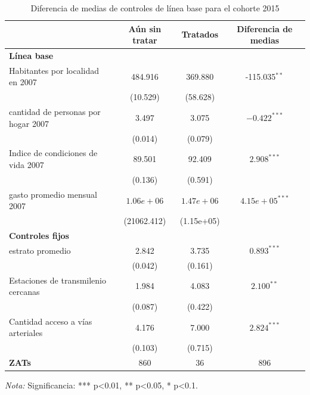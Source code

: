\documentclass{article}
\begin{document}
\begin{table} [H]
  \centering
  \caption{Diferencia de medias de controles de línea base para el cohorte 2015}
  \label{tab:comparacion_2015}
  \begin{tabular}{l c c c}
    \toprule
    & \textbf{Aún sin tratar} & \textbf{Tratados} & \textbf{Diferencia de medias} \\
    \midrule
    \multicolumn{4}{l}{\textbf{Línea base}} \\
    \midrule
    Habitantes por localidad en 2007 & 484.916 & 369.880 & -115.035$^{**}$ \\
    & (10.529) & (58.628) & \\
    cantidad de personas por hogar 2007 & 3.497 & 3.075 & $-0.422^{***}$ \\
    & (0.014) & (0.079) & \\
    Indice de condiciones de vida 2007 & 89.501 & 92.409 & $2.908^{***}$ \\
    & (0.136) & (0.591) & \\
    gasto promedio mensual 2007 & $1.06e+06$ & $1.47e+06$ & $4.15e+05^{***}$ \\
    & (21062.412) & (1.15e+05) & \\
    \midrule
    \multicolumn{4}{l}{\textbf{Controles fijos}} \\
    \midrule
    estrato promedio & 2.842 & 3.735 & $0.893^{***}$ \\
    & (0.042) & (0.161) & \\
    Estaciones de transmilenio cercanas & 1.984 & 4.083 & $2.100^{**}$ \\
    & (0.087) & (0.422) & \\
    Cantidad acceso a vías arteriales & 4.176 & 7.000 & $2.824^{***}$ \\
    & (0.103) & (0.715) & \\
    \midrule
    \textbf{ZATs} & 860 & 36 & 896 \\
    \bottomrule
  \end{tabular}
  \parbox[t]{\textwidth}{%
    \vspace{0.5em}
    \footnotesize{ \textit{Nota:} Significancia: *** p<0.01, ** p<0.05, * p<0.1.}}
\end{table}
\end{document}
